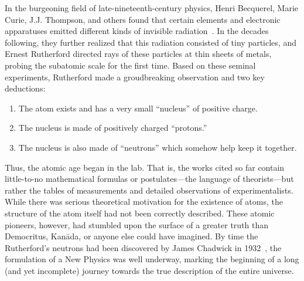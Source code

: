 \begin{dissertationintroduction}
In the burgeoning field of late-nineteenth-century physics, Henri Becquerel, Marie Curie, J.J. Thompson, and others found that certain elements and electronic apparatuses emitted different kinds of invisible radiation~\cite{Becquerel, Curie, RADVANYI2017544, Thompson}. 
In the decades following, they further realized that this radiation consisted of tiny particles\footnotemark{}, and Ernest Rutherford directed rays of these particles at thin sheets of metals, probing the subatomic scale for the first time. 
Based on these seminal experiments, Rutherford made a groudbreaking observation and two key deductions: %
\begin{enumerate}
    \item The atom exists\footnotemark{} and has a very small ``nucleus'' of positive charge.
    \item The nucleus is made of positively charged ``protons.''
    \item The nucleus is also made of ``neutrons'' which somehow help keep it together.
\end{enumerate}
Thus, the atomic age began in the lab. 
That is, the works cited so far contain little-to-no mathematical formulas or postulates---the language of theorists---but rather the tables of measurements and detailed observations of experimentalists. 
While there was serious theoretical motivation for the existence of atoms\footnotemark{}, the structure of the atom itself had not been correctly described. 
These atomic pioneers, however, had stumbled upon the surface of a greater truth than Democritus, Kan\=ada, or anyone else could have imagined. 
By time the Rutherford's neutrons had been discovered by James Chadwick in 1932~\cite{Chadwick1932}, the formulation of a New Physics was well underway, marking the beginning of a long (and yet incomplete) journey towards the true description of the entire universe. 


\end{dissertationintroduction}
